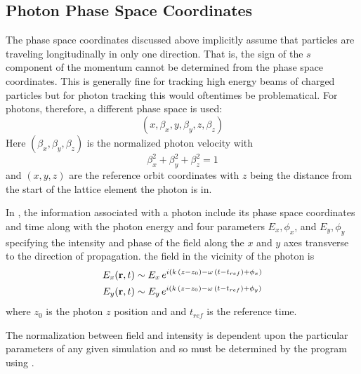 \subsection{Photon Phase Space Coordinates}
\label{s:photon.phase.space}

The phase space coordinates discussed above implicitly assume that
particles are traveling longitudinally in only one direction. That is,
the sign of the $s$ component of the momentum cannot be determined
from the phase space coordinates. This is generally fine for tracking
high energy beams of charged particles but for photon tracking this
would oftentimes be problematical. For photons, therefore, a different
phase space is used:
\begin{equation}
  (x, \beta_x, y, \beta_y, z, \beta_z)
  \label{xbybzb}
\end{equation}
Here $(\beta_x, \beta_y, \beta_z)$ is the normalized photon velocity with
\begin{equation}
  \beta_x^2 + \beta_y^2 + \beta_z^2 = 1 
  \label{bbb1}
\end{equation}
and $(x, y, z)$ are the reference orbit coordinates with $z$ being the
distance from the start of the lattice element the photon is in.

In \bmad, the information associated with a photon include its phase
space coordinates and time along with the photon energy and four
parameters $E_x, \phi_x$, and $E_y, \phi_y$ specifying the intensity
and phase of the field along the $x$ and $y$ axes transverse to the
direction of propagation.  the field in the vicinity of the photon is
\begin{align}
  E_x ({\bf r}, t) &\sim E_x \, e^{i (k \, (z - z_0) - \omega \, (t - t_{ref}) + \phi_x)} \nonumber \\
  E_y ({\bf r}, t) &\sim E_y \, e^{i (k \, (z - z_0) - \omega \, (t - t_{ref}) + \phi_y)} 
  \label{ertee}
\end{align}
where $z_0$ is the photon $z$ position and and $t_{ref}$ is the reference time.

The normalization between field and intensity is dependent upon the
particular parameters of any given simulation and so must be
determined by the program using \bmad.

